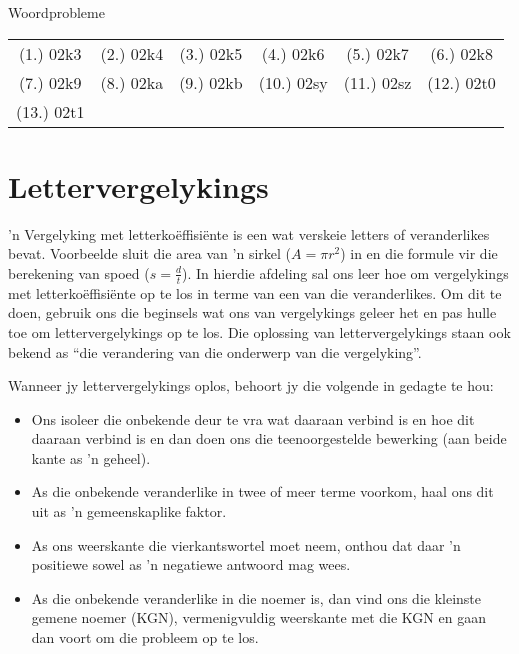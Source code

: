 \begin{exercises}{Woordprobleme}
{%
\par \practiceinfo
\par \begin{tabular}[h]{cccccc}
(1.)	02k3	&
(2.)	02k4	&
(3.)	02k5	&
(4.)	02k6	&
(5.)	02k7	&
(6.)	02k8	\\ %
(7.)	02k9	&
(8.)	02ka	&
(9.)	02kb	&
(10.) 02sy &
(11.) 02sz &
(12.) 02t0 \\ %
(13.) 02t1
\end{tabular}
}
\end{exercises}

\section{Lettervergelykings}

’n Vergelyking met letterkoëffisiënte is een wat verskeie letters of veranderlikes bevat. Voorbeelde sluit die area
van ’n sirkel ($A=\pi{r}^{2}$) in en die formule vir die berekening van spoed ($s=\frac{d}{t}$). In hierdie afdeling sal ons leer hoe om vergelykings met letterkoëffisiënte op te los in terme van een van die veranderlikes. 
Om dit te doen, gebruik ons die beginsels wat ons van vergelykings geleer het en pas hulle toe om lettervergelykings op te los. Die oplossing van lettervergelykings staan ook bekend as ``die verandering van die onderwerp van die vergelyking''.

Wanneer jy lettervergelykings oplos, behoort jy die volgende in gedagte te hou:
\begin{itemize}
\item Ons isoleer die onbekende deur te vra wat daaraan verbind is en hoe dit daaraan verbind is en dan doen
ons die teenoorgestelde bewerking (aan beide kante as ’n geheel).
\item As die onbekende veranderlike in twee of meer terme voorkom, haal ons dit uit as ’n gemeenskaplike faktor. 
\item  As ons weerskante die vierkantswortel moet neem, onthou dat daar ’n positiewe sowel as ’n negatiewe
antwoord mag wees.
\item  As die onbekende veranderlike in die noemer is, dan vind ons die kleinste gemene noemer (KGN), vermenigvuldig weerskante met die KGN en gaan dan voort om die probleem op te los.
\end{itemize}

